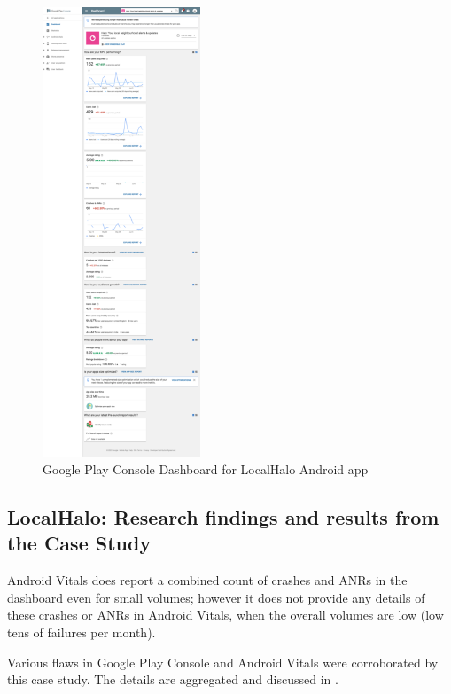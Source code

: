 \begin{figure}
  \begin{center}
    \includegraphics[width=0.42\textwidth]{images/google-play-console/resized-25pct-appdashboardplace_555059634831.png}
  \end{center}
  \caption{Google Play Console Dashboard for LocalHalo Android app}
  \label{fig:gpc-dashboard-for-localhalo-android-resized}
\end{figure}


\subsection{LocalHalo: Research findings and results from the Case Study}
Android Vitals does report a combined count of crashes and ANRs in the dashboard even for small volumes; however it does not provide any details of these crashes or ANRs in Android Vitals, when the overall volumes are low (low tens of failures per month).

Various flaws in Google Play Console and Android Vitals were corroborated by this case study. The details are aggregated and discussed in .

